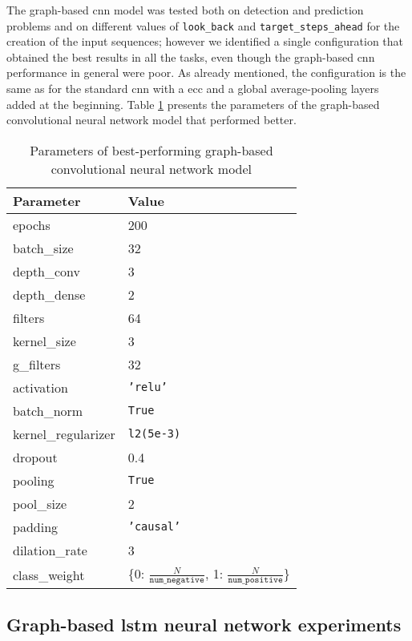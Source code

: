 The graph-based \acs{cnn} model was tested both on detection and prediction problems and on different values of \texttt{look\_back} and \texttt{target\_steps\_ahead} for the creation of the input sequences; however we identified a single configuration that obtained the best results in all the tasks, even though the graph-based \acs{cnn} performance in general were poor. As already mentioned, the configuration is the same as for the standard \acs{cnn} with a \acs{ecc} and a global average-pooling layers added at the beginning. Table \ref{tab:gconv_param} presents the parameters of the graph-based convolutional neural network model that performed better.
\begin{table}[htbp]
    \centering
    \begin{tabular}{ll}
        \hline
        \textbf{Parameter}  & \textbf{Value} \\\hline
        epochs              & 200 \\
        batch\_size         & 32 \\
        depth\_conv         & 3 \\
        depth\_dense        & 2 \\
        filters             & 64 \\
        kernel\_size        & 3 \\
        g\_filters          & 32 \\
        activation          & \texttt{'relu'} \\
        batch\_norm         & \texttt{True} \\
        kernel\_regularizer & \texttt{l2(5e-3)} \\
        dropout             & 0.4 \\
        pooling             & \texttt{True} \\
        pool\_size          & 2 \\
        padding             & \texttt{'causal'} \\
        dilation\_rate      & 3 \\
        class\_weight       & \{0: $\frac{N}{\texttt{num\_negative}}$, 1: $\frac{N}{\texttt{num\_positive}}$\}
    \end{tabular}
    \caption{Parameters of best-performing graph-based convolutional neural network model}
    \label{tab:gconv_param}
\end{table}

\subsection{Graph-based \acs{lstm} neural network experiments}
